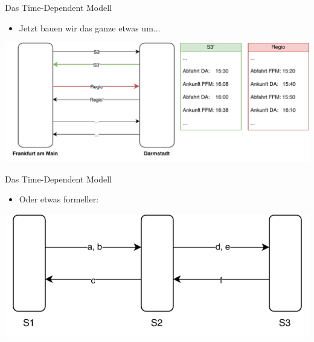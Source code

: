 \begin{frame}{Das Time-Dependent Modell}
	\begin{itemize}
		\item Jetzt bauen wir das ganze etwas um...
	\end{itemize}

	\begin{center}
		\includegraphics[width=\linewidth]{images/time-dependent/basic.pdf}
	\end{center}
\end{frame}

\begin{frame}{Das Time-Dependent Modell}
	\begin{itemize}
		\item Oder etwas formeller:
	\end{itemize}

	\begin{center}
		\includegraphics[width=\linewidth]{images/time-dependent/formal.pdf}
	\end{center}
\end{frame}


